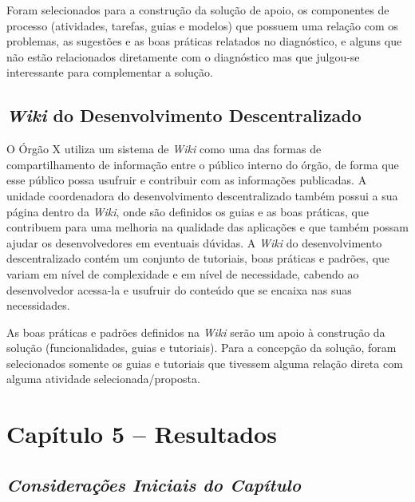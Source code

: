Foram selecionados para a construção da solução de apoio, os componentes de processo (atividades, tarefas, guias e modelos) que possuem uma relação com os problemas, as sugestões e as boas práticas relatados no diagnóstico, e alguns que não estão relacionados diretamente com o diagnóstico mas que julgou-se interessante para complementar a solução.

\section{\textit{Wiki} do Desenvolvimento Descentralizado}

O Órgão X utiliza um sistema de \textit{Wiki} como uma das formas de compartilhamento de informação entre o público interno do órgão, de forma que esse público possa usufruir e contribuir com as informações publicadas. A unidade coordenadora do desenvolvimento descentralizado também possui a sua página dentro da \textit{Wiki}, onde são definidos os guias e as boas práticas, que contribuem para uma melhoria na qualidade das aplicações e que também possam ajudar os desenvolvedores em eventuais dúvidas. A \textit{Wiki} do desenvolvimento descentralizado contém um conjunto de tutoriais, boas práticas e padrões, que variam em nível de complexidade e em nível de necessidade, cabendo ao desenvolvedor acessa-la e usufruir do conteúdo que se encaixa nas suas necessidades.

As boas práticas e padrões definidos na \textit{Wiki} serão um apoio à construção da solução (funcionalidades, guias e tutoriais). Para a concepção da solução, foram selecionados somente os guias e tutoriais que tivessem alguma relação direta com alguma atividade selecionada/proposta.

\chapter[Capítulo 5 – Resultados]{Capítulo 5 – Resultados}

\section{\textit{Considerações Iniciais do Capítulo}}


